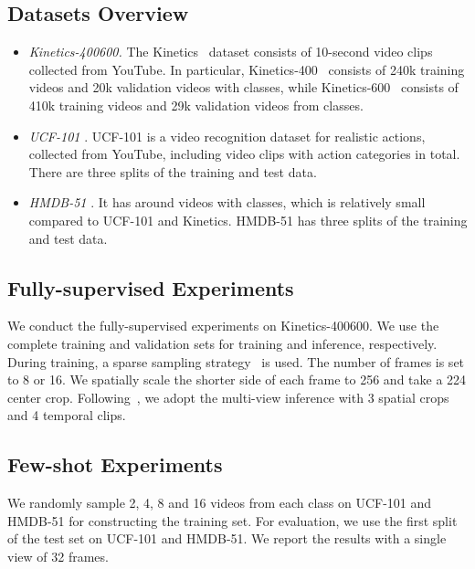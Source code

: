 \documentclass[runningheads]{llncs}
\begin{document}
\subsection{Datasets Overview}\label{sec:dataset_overview}
\begin{itemize}
\item \textit{Kinetics-400600.} The Kinetics~\cite{k400,k600} dataset consists of 10-second video clips collected from YouTube. In particular, Kinetics-400~\cite{k400} consists of 240k training videos and 20k validation videos with  classes, while Kinetics-600~\cite{k600} consists of 410k training videos and 29k validation videos from  classes. 

\item \textit{UCF-101} \cite{soomro2012ucf101}. UCF-101 is a video recognition dataset for realistic actions, collected from YouTube, including  video clips with  action categories in total. There are three splits of the training and test data.

\item \textit{HMDB-51} \cite{kuehne2011hmdb}. It has around  videos with  classes, which is relatively small compared to UCF-101 and Kinetics. HMDB-51 has three splits of the training and test data.
\end{itemize}

\subsection{Fully-supervised Experiments}\label{sec:split_fully}
We conduct the fully-supervised experiments on Kinetics-400600. We use the complete training and validation sets for training and inference, respectively. During training, a sparse sampling strategy~\cite{wang2016tsn} is used. The number of frames is set to 8 or 16. We spatially scale the shorter side of each frame to 256 and take a 224 center crop.  Following~\cite{liu2021video,arnab2021vivit,timesformer2021}, we adopt the multi-view inference with 3 spatial crops and 4 temporal clips.

\subsection{Few-shot Experiments}\label{sec:split_few}
We randomly sample 2, 4, 8 and 16 videos from each class on UCF-101 and HMDB-51 for constructing the training set. For evaluation, we use the first split of the test set on UCF-101 and HMDB-51. We report the results with a single view of 32 frames.
\end{document}
